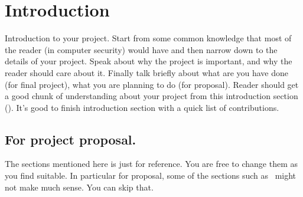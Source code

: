 \section{Introduction}
\label{sec:intro}

Introduction to your project. Start from some common knowledge that most of the
reader (in computer security) would have and then narrow down to the details of
your project. Speak about why the project is important, and why the reader
should care about it. Finally talk briefly about what are you have done (for
final project), what you are planning to do (for proposal). Reader should get a
good chunk of understanding about your project from this introduction section
().
It's good to finish introduction section with a quick list of contributions. 


\subsection{For project proposal.}\label{sec:proposal}
The sections mentioned here is just for reference. You are free to change them
as you find suitable. In particular for proposal, some of the sections such
as~ might not make much sense. You can skip that. 




